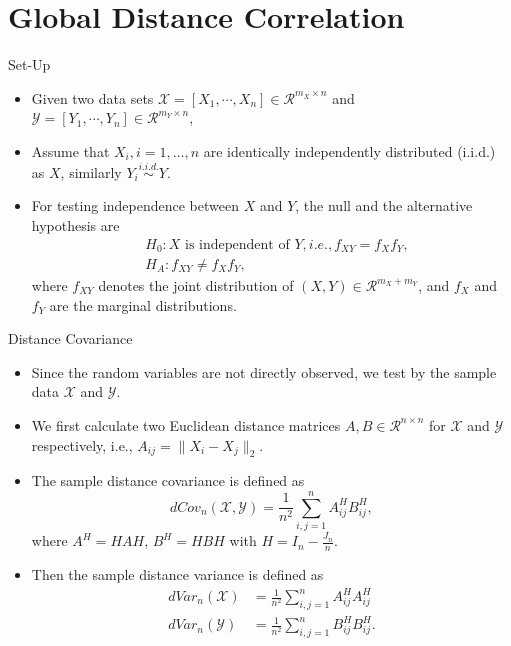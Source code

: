 \documentclass{beamer}
\begin{document}
\section{Global Distance Correlation}
\begin{frame}{Set-Up}
\begin{itemize}[<+->]
\item Given two data sets $\mathcal{X}=[X_{1},\cdots, X_{n}] \in \mathcal{R}^{m_{X} \times n}$ and $\mathcal{Y}=[Y_{1},\cdots, Y_{n}] \in \mathcal{R}^{m_{Y} \times n}$, \item Assume that $X_{i}, i=1,\ldots,n$ are identically independently distributed (i.i.d.) as $X$, similarly $Y_{i} \stackrel{i.i.d.}{\sim} Y$. 
\item For testing independence between $X$ and $Y$, the null and the alternative hypothesis are
\begin{align*}
& H_{0}: X \mbox{ is independent of } Y, i.e., f_{XY}=f_{X}f_{Y},\\
& H_{A}: f_{XY} \neq f_{X}f_{Y},
\end{align*}
where $f_{XY}$ denotes the joint distribution of $(X,Y) \in \mathcal{R}^{m_{X}+m_{Y}}$, and $f_{X}$ and $f_{Y}$ are the marginal distributions. 
\end{itemize}
\end{frame}

\begin{frame}{Distance Covariance}
\begin{itemize}[<+->]
\item Since the random variables are not directly observed, we test by the sample data $\mathcal{X}$ and $\mathcal{Y}$.
\item We first calculate two Euclidean distance matrices $A, B \in \mathcal{R}^{n \times n}$ for $\mathcal{X}$ and $\mathcal{Y}$ respectively, i.e., $A_{ij}=\|X_{i}-X_{j}\|_{2}$. 
\item The sample distance covariance is defined as
\begin{equation}
\label{dCovEqu}
dCov_{n}(\mathcal{X},\mathcal{Y})=\frac{1}{n^2}\sum_{i,j=1}^{n}A^{H}_{ij}B^{H}_{ij},
\end{equation}
where $A^{H}=HAH$, $B^{H}=HBH$ with $H=I_{n}-\frac{J_{n}}{n}$. 
\item Then the sample distance variance is defined as
\begin{align*}
dVar_{n}(\mathcal{X}) &=\frac{1}{n^2}\sum_{i,j=1}^{n}A^{H}_{ij}A^{H}_{ij}\\
dVar_{n}(\mathcal{Y}) &=\frac{1}{n^2}\sum_{i,j=1}^{n}B^{H}_{ij}B^{H}_{ij}.
\end{align*}
\end{itemize}
\end{frame}
\end{document}
